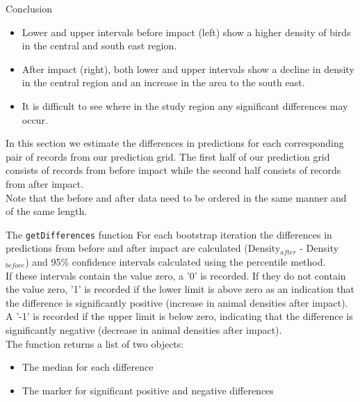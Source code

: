\begin{block}{Conclusion}
\begin{itemize}
  \item Lower and upper intervals before impact (left) show a higher density of birds in the central and south east region.  
  \item After impact (right), both lower and upper intervals show a decline in density in the central region and an increase in the area to the south east.  
  \item It is difficult to see where in the study region any significant differences may occur.
\end{itemize}
\end{block}

\noindent In this section we estimate the differences in predictions for each corresponding pair of records from our prediction grid. The first half of our prediction grid consists of records from before impact while the second half consists of records from after impact. \\

\noindent Note that the before and after data need to be ordered in the same manner and of the same length. 


\begin{block}{The {\tt getDifferences} function}
For each bootstrap iteration the differences in predictions from before and after impact are calculated (Density$_{after}$ - Density$_{before}$) and 95\% confidence intervals calculated using the percentile method. \\

\noindent If these intervals contain the value zero, a '0' is recorded. If they do not contain the value zero, '1' is recorded if the lower limit is above zero as an indication that the difference is significantly positive (increase in animal densities after impact). A '-1' is recorded if the upper limit is below zero, indicating that the difference is significantly negative (decrease in animal densities after impact). \\

\noindent The function returns a list of two objects: 
\begin{itemize}
\item{The median for each difference}
\item{The marker for significant positive and negative differences}
\end{itemize}
\end{block}


